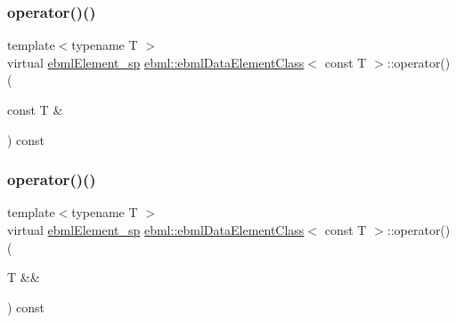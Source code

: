 \mbox{\label{classebml_1_1ebmlDataElementClass_3_01const_01T_01_4_a7873f495e6b29cca5f3d73e0e34873f5}} 
\subsubsection{\texorpdfstring{operator()()}{operator()()}\hspace{0.1cm}{\footnotesize\ttfamily [1/2]}}
{\footnotesize\ttfamily template$<$typename T $>$ \\
virtual \mbox{\hyperlink{namespaceebml_adad533b7705a16bb360fe56380c5e7be}{ebml\+Element\+\_\+sp}} \mbox{\hyperlink{classebml_1_1ebmlDataElementClass}{ebml\+::ebml\+Data\+Element\+Class}}$<$ const T $>$\+::operator() (\begin{DoxyParamCaption}\item[{const T \&}]{ }\end{DoxyParamCaption}) const\hspace{0.3cm}{\ttfamily [virtual]}}

\mbox{\label{classebml_1_1ebmlDataElementClass_3_01const_01T_01_4_ab7167a66c766cc253d32fca44856c70e}} 
\subsubsection{\texorpdfstring{operator()()}{operator()()}\hspace{0.1cm}{\footnotesize\ttfamily [2/2]}}
{\footnotesize\ttfamily template$<$typename T $>$ \\
virtual \mbox{\hyperlink{namespaceebml_adad533b7705a16bb360fe56380c5e7be}{ebml\+Element\+\_\+sp}} \mbox{\hyperlink{classebml_1_1ebmlDataElementClass}{ebml\+::ebml\+Data\+Element\+Class}}$<$ const T $>$\+::operator() (\begin{DoxyParamCaption}\item[{T \&\&}]{ }\end{DoxyParamCaption}) const\hspace{0.3cm}{\ttfamily [virtual]}}




